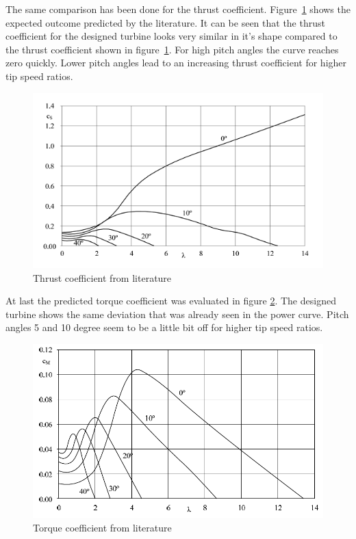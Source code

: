 \documentclass[10pt]{article}
\begin{document}
The same comparison has been done for the thrust coefficient. Figure~\ref{fig:thrust-coeff-lit} shows the expected outcome predicted by the literature. It can be seen that the thrust coefficient for the designed turbine looks very similar in it's shape compared to the thrust coefficient shown in figure~\ref{fig:thrust-coeff-lit}. For high pitch angles the curve reaches zero quickly. Lower pitch angles lead to an increasing thrust coefficient for higher tip speed ratios.

\begin{figure}[H]
\centering
\includegraphics[width=1\linewidth]{../CIP_3/Report/thrust_coeff_literature.png}
\caption{Thrust coefficient from literature}
\label{fig:thrust-coeff-lit}
\end{figure} 

At last the predicted torque coefficient was evaluated in figure \ref{fig:torque-coeff-lit}. The designed turbine shows the same deviation that was already seen in the power curve. Pitch angles 5 and 10 degree seem to be a little bit off for higher tip speed ratios. 

\begin{figure}[H]
\centering
\includegraphics[width=1\linewidth]{../CIP_3/Report/torque_coeff_literature.png}
\caption{Torque coefficient from literature}
\label{fig:torque-coeff-lit}
\end{figure} 
\end{document}
